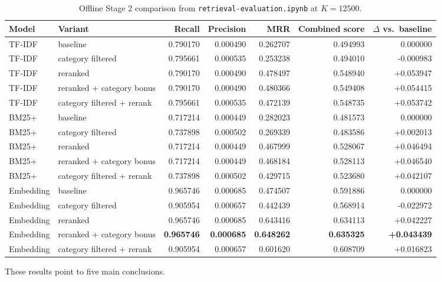 \documentclass[11pt,a4paper]{article}
\begin{document}
\begin{table}[H]
\centering
\scriptsize
\begin{tabular}{l l r r r r r}
\toprule
Model & Variant & Recall & Precision & MRR & Combined score & \(\Delta\) vs.\ baseline \\
\midrule
TF-IDF & baseline & 0.790170 & 0.000490 & 0.262707 & 0.494993 & 0.000000 \\
TF-IDF & category filtered & 0.795661 & 0.000535 & 0.253238 & 0.494010 & -0.000983 \\
TF-IDF & reranked & 0.790170 & 0.000490 & 0.478497 & 0.548940 & +0.053947 \\
TF-IDF & reranked + category bonus & 0.790170 & 0.000490 & 0.480366 & 0.549408 & +0.054415 \\
TF-IDF & category filtered + rerank & 0.795661 & 0.000535 & 0.472139 & 0.548735 & +0.053742 \\
\midrule
BM25+ & baseline & 0.717214 & 0.000449 & 0.282023 & 0.481573 & 0.000000 \\
BM25+ & category filtered & 0.737898 & 0.000502 & 0.269339 & 0.483586 & +0.002013 \\
BM25+ & reranked & 0.717214 & 0.000449 & 0.467999 & 0.528067 & +0.046494 \\
BM25+ & reranked + category bonus & 0.717214 & 0.000449 & 0.468184 & 0.528113 & +0.046540 \\
BM25+ & category filtered + rerank & 0.737898 & 0.000502 & 0.429715 & 0.523680 & +0.042107 \\
\midrule
Embedding & baseline & 0.965746 & 0.000685 & 0.474507 & 0.591886 & 0.000000 \\
Embedding & category filtered & 0.905954 & 0.000657 & 0.442439 & 0.568914 & -0.022972 \\
Embedding & reranked & 0.965746 & 0.000685 & 0.643416 & 0.634113 & +0.042227 \\
Embedding & reranked + category bonus & \textbf{0.965746} & \textbf{0.000685} & \textbf{0.648262} & \textbf{0.635325} & \textbf{+0.043439} \\
Embedding & category filtered + rerank & 0.905954 & 0.000657 & 0.601620 & 0.608709 & +0.016823 \\
\bottomrule
\end{tabular}
\caption{Offline Stage 2 comparison from \texttt{retrieval-evaluation.ipynb} at \(K=12500\).}
\label{tab:phase2results}
\end{table}

These results point to five main conclusions.
\end{document}
